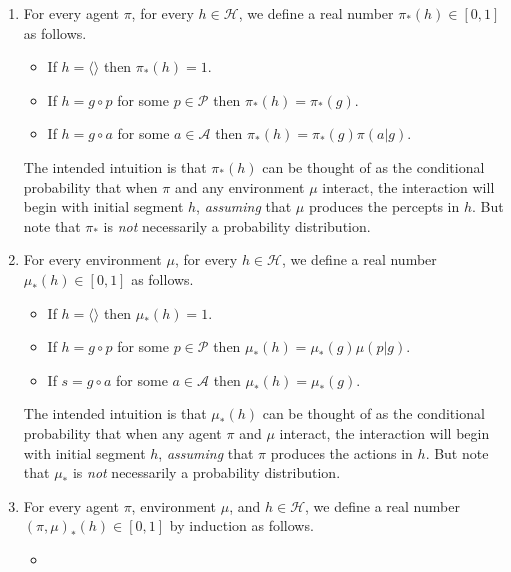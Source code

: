 \documentclass[runningheads]{llncs}
\begin{document}
\begin{definition}
\label{pullbackdef}
    \begin{enumerate}
        \item
        For every agent $\pi$, for every $h\in\mathcal H$, we define a real number
        $\pi_*(h)\in[0,1]$ as follows.
        \begin{itemize}
            \item
            If $h=\langle\rangle$ then $\pi_*(h)=1$.
            \item
            If $h=g\circ p$ for some $p\in\mathcal P$ then $\pi_*(h)=\pi_*(g)$.
            \item
            If $h=g\circ a$ for some $a\in\mathcal A$ then $\pi_*(h)=\pi_*(g)\pi(a|g)$.
        \end{itemize}
        The intended intuition is that $\pi_*(h)$ can be thought of as the
        conditional probability that when $\pi$
        and any environment
        $\mu$ interact, the interaction will begin with initial segment
        $h$, \emph{assuming}
        that $\mu$ produces the percepts in $h$.
        But note that $\pi_*$ is \emph{not} necessarily a probability distribution.
        \item
        For every environment $\mu$, for every $h\in\mathcal H$, we define a real number
        $\mu_*(h)\in[0,1]$ as follows.
        \begin{itemize}
            \item
            If $h=\langle\rangle$ then $\mu_*(h)=1$.
            \item
            If $h=g\circ p$ for some $p\in\mathcal P$ then $\mu_*(h)=\mu_*(g)\mu(p|g)$.
            \item
            If $s=g\circ a$ for some $a\in\mathcal A$ then $\mu_*(h)=\mu_*(g)$.
        \end{itemize}
        The intended intuition is that $\mu_*(h)$ can be thought of as the
        conditional probability that when any agent $\pi$ and $\mu$ interact,
        the interaction will begin with initial segment $h$, \emph{assuming} that
        $\pi$ produces the actions in $h$.
        But note that $\mu_*$ is \emph{not} necessarily a probability distribution.
        \item
        For every agent $\pi$, environment $\mu$, and $h\in\mathcal H$, we define a
        real number $(\pi,\mu)_*(h)\in[0,1]$ by induction as follows.
        \begin{itemize}
            \item

\end{itemize}
\end{enumerate}
\end{definition}
\end{document}
